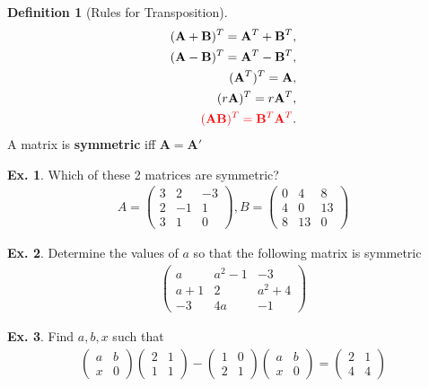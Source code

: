 \documentclass[10pt,a4paper]{book}
\newcommand{\red}[1]{\textcolor{red}{#1}}
\theoremstyle{definition}\newtheorem{definition}{Definition}
\theoremstyle{definition}\newtheorem{fact}{Fact}
\theoremstyle{definition}\newtheorem{ex}{Ex.}
\theoremstyle{definition}\newtheorem{project}{Project}
\theoremstyle{definition}\newtheorem{problem}{Problem}
\theoremstyle{definition}\newtheorem{example}{Example}
\numberwithin{theorem}{chapter}
\numberwithin{corollary}{chapter}
\numberwithin{assumption}{chapter}
\numberwithin{definition}{chapter}
\numberwithin{prop}{chapter}
\numberwithin{notation}{chapter}
\numberwithin{problem}{chapter}
\numberwithin{example}{chapter}
\numberwithin{fact}{chapter}
\numberwithin{ex}{chapter}
\newenvironment{fdefinition}
{\begin{mdframed}\begin{definition}}
		{\end{definition}\end{mdframed}}
\def\A{\mathbf A}
\def\B{\mathbf B}
\begin{document}
	\begin{fdefinition}[Rules for Transposition]
		\begin{align*}
			(\A+\B)^T = \A^T + \B^T,    \\
			(\A-\B)^T = \A^T - \B^T,    \\
			(\A^T)^T = \A,              \\
			(r\A)^T = r\A^T,            \\
			\red{(\A\B)^T = \B^T \A^T}. 
		\end{align*}
		A matrix is \textbf{symmetric} iff $\A = \A'$
	\end{fdefinition}
	
	\begin{ex}
		Which of these 2 matrices are symmetric?
		\begin{align*}
			A = \begin{pmatrix}
				3 & 2  & -3 \\
				2 & -1 & 1  \\
				3 & 1  & 0  
			\end{pmatrix}, 
			B = \begin{pmatrix}
				0 & 4  & 8  \\
				4 & 0  & 13 \\
				8 & 13 & 0  
			\end{pmatrix}
		\end{align*}
	\end{ex}
	
	\begin{ex}
		Determine the values of $a$ so that the following matrix is symmetric
		\begin{align}
			\begin{pmatrix}
				a   & a^2 -1 & -3      \\
				a+1 & 2      & a^2 + 4 \\
				-3  & 4a     & -1      
			\end{pmatrix}
		\end{align}
	\end{ex}
	
	\begin{ex}
		Find $a,b,x$ such that
		\begin{align*}
			\begin{pmatrix}
				a & b \\ x & 0
			\end{pmatrix}
			\begin{pmatrix}
				2 & 1 \\ 1 & 1
			\end{pmatrix}
			-
			\begin{pmatrix}
				1 & 0 \\ 2 & 1
			\end{pmatrix}
			\begin{pmatrix}
				a & b \\ x & 0
			\end{pmatrix}
			=
			\begin{pmatrix}
				2 & 1 \\ 4 & 4
			\end{pmatrix}
		\end{align*}
	\end{ex}
	
\end{document}
